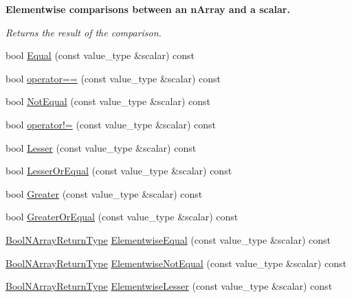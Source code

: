 \begin{Indent}{\bf Elementwise comparisons between an n\-Array and a scalar.}\par
{\em Returns the result of the comparison. }\begin{DoxyCompactItemize}
\item 
bool \hyperlink{classvct_dynamic_const_n_array_base_ad362d1ebbee3e4b4c80b729f9e0487ac}{Equal} (const value\-\_\-type \&scalar) const 
\item 
bool \hyperlink{classvct_dynamic_const_n_array_base_a045b16984512ae1ffa3914d96baf2b0c}{operator==} (const value\-\_\-type \&scalar) const 
\item 
bool \hyperlink{classvct_dynamic_const_n_array_base_a899db7397e15e6daa1403cb6b117b5d6}{Not\-Equal} (const value\-\_\-type \&scalar) const 
\item 
bool \hyperlink{classvct_dynamic_const_n_array_base_a8cb0651c3eb2c46d8bbdfb4d5aa66f6d}{operator!=} (const value\-\_\-type \&scalar) const 
\item 
bool \hyperlink{classvct_dynamic_const_n_array_base_a7dc65080abbe1fa0200a92ea52b78cd6}{Lesser} (const value\-\_\-type \&scalar) const 
\item 
bool \hyperlink{classvct_dynamic_const_n_array_base_ac0ef675164ea66b6fcc342d245719f71}{Lesser\-Or\-Equal} (const value\-\_\-type \&scalar) const 
\item 
bool \hyperlink{classvct_dynamic_const_n_array_base_a9ca880f2e8a85234665c919470ae4df0}{Greater} (const value\-\_\-type \&scalar) const 
\item 
bool \hyperlink{classvct_dynamic_const_n_array_base_a7595cf8870953193090ba80d1fe12087}{Greater\-Or\-Equal} (const value\-\_\-type \&scalar) const 
\item 
\hyperlink{classvct_dynamic_const_n_array_base_a983f2b7edd51a896d447383b5a5af289}{Bool\-N\-Array\-Return\-Type} \hyperlink{classvct_dynamic_const_n_array_base_aa5a7d14eb9cf3070449e4a74a6e2caf1}{Elementwise\-Equal} (const value\-\_\-type \&scalar) const 
\item 
\hyperlink{classvct_dynamic_const_n_array_base_a983f2b7edd51a896d447383b5a5af289}{Bool\-N\-Array\-Return\-Type} \hyperlink{classvct_dynamic_const_n_array_base_ab6af7dba17e29d037bded30136a9bd6e}{Elementwise\-Not\-Equal} (const value\-\_\-type \&scalar) const 
\item 
\hyperlink{classvct_dynamic_const_n_array_base_a983f2b7edd51a896d447383b5a5af289}{Bool\-N\-Array\-Return\-Type} \hyperlink{classvct_dynamic_const_n_array_base_a9e034008c80af9d33e13cd8864e5fbce}{Elementwise\-Lesser} (const value\-\_\-type \&scalar) const 

\end{DoxyCompactItemize}
\end{Indent}
